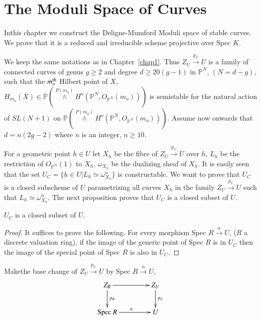 \chapter{The Moduli Space of Curves}\label{chap2}%

In\pageoriginale this chapter we construct the Deligne-Mumford Moduli
space of stable curves. We prove that it is a reduced and irreducible
scheme projective over Spec $K$.  

We keep the same notations as in Chapter~\ref{chap1}. Thus $Z_U
\xrightarrow{p_U} U$ is a family of connected curves of genus $g \geq
2$ and degree $d \geq 20 (g-1)$ in $\mathbb{P}^N$, $(N = d-g)$, such
that the $m^{\rm th}_o$ Hilbert point of $X$, $H_{m_o} (X)
\in \mathbb{P}( \overset{P(m_o)}\wedge H^o (\mathbb{P}^N ,
O_{\mathbb{P}^{N}} (m_o)))$ is semistable for the natural action of
$SL (N+1)$ on $\mathbb{P} (\overset{P (m_o)} \wedge H^o (\mathbb{P}^N,
O_{\mathbb{P}^N} (m_o)))$. Assume now onwards that $d=n(2g-2)$ where
$n$ is an integer, $n \geq 10$. 

 For a geometric point $h \in U$ let $X_h$ be the fibre of
 $Z_U \xrightarrow{p_U} U$ over $h$, $L_h$ be the restriction of
 $O_{\mathbb{P}^N}(1)$ to $X_h$, $\omega_{X_h}$ be the dualizing sheaf
 of $X_h$. It is easily seen that the set $U_C = \{h \in U |
 L_h \simeq \omega_{X_h}^n\}$ is constructable. We want to prove that
 $U_C$ is a closed subscheme of $U$ parametrizing all curves $X_h$ in
 the family $Z_U \xrightarrow{p_U} U$ such that $L_h \simeq
 \omega_{X_h}^n$. The next proposition proves that $U_C$ is a closed
 subset of $U$. 
 
\setcounter{section}{2}
\setcounter{subprop}{-1}
 \begin{subprop}%
$U_C$ is a closed subset of $U$. 
   \end{subprop}   

   \begin{proof}
It suffices to prove the following. For every morphism Spec $R
\xrightarrow{\alpha}  U$, ($R$ a discrete valuation ring), if the
image of the generic point of Spec $R$ is in $U_C$ then the image of
the special  point of Spec $R$ is also in $U_C$. 
   \end{proof}   
   
   Make\pageoriginale the base change of $Z_U \xrightarrow{p_U} U$ by
   Spec $R    \xrightarrow{\alpha} U$, 
\[
\xymatrix@C=1.5cm{
Z_R\ar[r]\ar[d]^{p_R} & Z_U\ar[d]^{p_U}\\
\text{Spec } R \ar[r]^{\alpha} & U
}
\]

